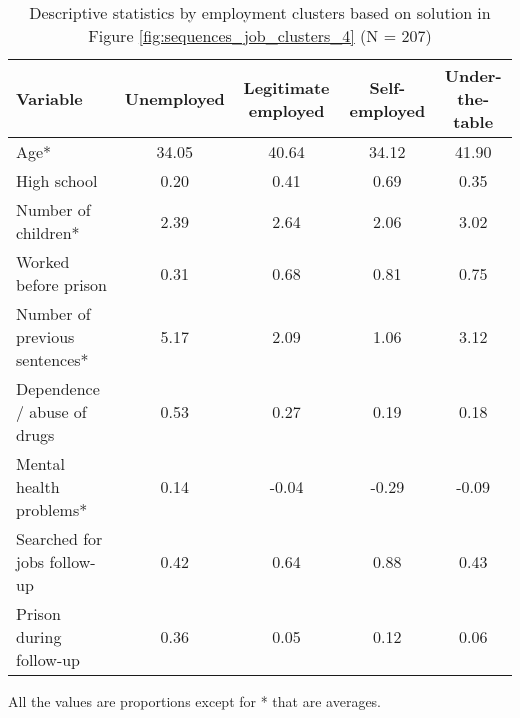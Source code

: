 \begin{table}[htp]
\footnotesize
\setlength{\tabcolsep}{10pt}
\renewcommand{\arraystretch}{1.3}
\begin{threeparttable}
\centering
\caption{Descriptive statistics by employment clusters \newline based on solution in Figure \ref{fig:sequences_job_clusters_4} (N = 207)} 
\label{tab:descriptive_job_se_clusters_4}
\begin{tabular}{lcccc}
  \hline
Variable & Unemployed & Legitimate employed & Self-employed & Under-the-table \\ 
  \hline
Age* & 34.05 & 40.64 & 34.12 & 41.90 \\ 
  High school & 0.20 & 0.41 & 0.69 & 0.35 \\ 
  Number of children* & 2.39 & 2.64 & 2.06 & 3.02 \\ 
  Worked before prison & 0.31 & 0.68 & 0.81 & 0.75 \\ 
  Number of previous sentences* & 5.17 & 2.09 & 1.06 & 3.12 \\ 
  Dependence / abuse of drugs & 0.53 & 0.27 & 0.19 & 0.18 \\ 
  Mental health problems* & 0.14 & -0.04 & -0.29 & -0.09 \\ 
  Searched for jobs follow-up & 0.42 & 0.64 & 0.88 & 0.43 \\ 
  Prison during follow-up & 0.36 & 0.05 & 0.12 & 0.06 \\ 
   \hline
\end{tabular}
\begin{tablenotes}
\scriptsize
\item All the values are proportions except for * that are averages.
\end{tablenotes}
\end{threeparttable}
\end{table}
